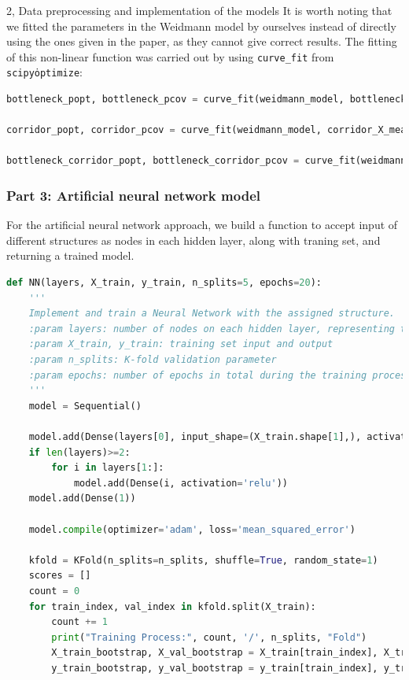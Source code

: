 \documentclass[10pt,a4paper]{article}
\begin{document}
\begin{task}{2, Data preprocessing and implementation of the models}
It is worth noting that we fitted the parameters in the Weidmann model by ourselves instead of directly using the ones given in the paper, as they cannot give correct results. The fitting of this non-linear function was carried out by using \texttt{curve\_fit} from \texttt{scipy\.optimize}:

\begin{lstlisting}[language=Python]
bottleneck_popt, bottleneck_pcov = curve_fit(weidmann_model, bottleneck_X_mean_train, bottleneck_y_train)

corridor_popt, corridor_pcov = curve_fit(weidmann_model, corridor_X_mean_train, corridor_y_train)

bottleneck_corridor_popt, bottleneck_corridor_pcov = curve_fit(weidmann_model, bottleneck_corridor_X_mean_train, bottleneck_corridor_y_train)
\end{lstlisting}

\subsubsection*{Part 3: Artificial neural network model}

For the artificial neural network approach, we build a function to accept input of different structures as nodes in each hidden layer, along with traning set, and returning a trained model.


\begin{lstlisting}[language=Python]
def NN(layers, X_train, y_train, n_splits=5, epochs=20):
    '''
    Implement and train a Neural Network with the assigned structure.
    :param layers: number of nodes on each hidden layer, representing the structure of the Neural Network
    :param X_train, y_train: training set input and output
    :param n_splits: K-fold validation parameter
    :param epochs: number of epochs in total during the training process
    '''
    model = Sequential()
    
    model.add(Dense(layers[0], input_shape=(X_train.shape[1],), activation='relu'))
    if len(layers)>=2:
        for i in layers[1:]:
            model.add(Dense(i, activation='relu'))
    model.add(Dense(1))

    model.compile(optimizer='adam', loss='mean_squared_error')
    
    kfold = KFold(n_splits=n_splits, shuffle=True, random_state=1)
    scores = []
    count = 0
    for train_index, val_index in kfold.split(X_train):
        count += 1
        print("Training Process:", count, '/', n_splits, "Fold")
        X_train_bootstrap, X_val_bootstrap = X_train[train_index], X_train[val_index]
        y_train_bootstrap, y_val_bootstrap = y_train[train_index], y_train[val_index]
        

\end{lstlisting}
\end{task}
\end{document}
